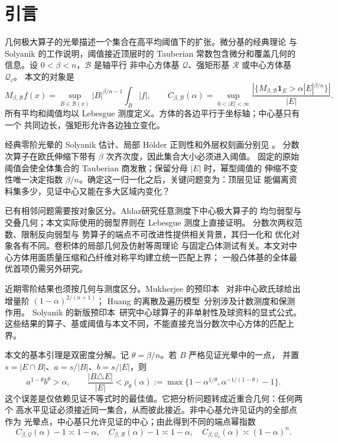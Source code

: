 \section{引言}\label{sec:introduction}

几何极大算子的光晕描述一个集合在高平均阈值下的扩张。微分基的经典理论
\cite{deGuzman1975}与 Solyanik 的工作\cite{Solyanik1993}说明，阈值接近顶层时的
Tauberian 常数包含微分和覆盖几何的信息。设 $0<\beta<n$，$\mathcal B$ 是轴平行
非中心方体基 $\mathcal Q$、强矩形基 $\mathcal R$ 或中心方体基 $\mathcal Q_c$。
本文的对象是
\[
 M_{\beta,\mathcal B}f(x)=\sup_{B\in\mathcal B(x)}
 |B|^{\beta/n-1}\int_B|f|,
 \qquad
 C_{\beta,\mathcal B}(\alpha)=\sup_{0<|E|<\infty}
 \frac{|\{M_{\beta,\mathcal B}\mathbf1_E>\alpha|E|^{\beta/n}\}|}{|E|}.
\]
所有平均和阈值均以 Lebesgue 测度定义。方体的各边平行于坐标轴；中心基只有一个
共同边长，强矩形允许各边独立变化。

经典零阶光晕的 Solyanik 估计、局部 H\"older 正则性和外层权刻画分别见
\cite{HagelsteinParissis2014,HagelsteinParissis2015,HagelsteinParissis2016,HagelsteinParissis2018}。
分数次算子在欧氏伸缩下带有 $\beta$ 次齐次度，因此集合大小必须进入阈值。
固定的原始阈值会使全体集合的 Tauberian 商发散；保留分母 $|E|$ 时，幂型阈值的
伸缩不变性唯一决定指数 $\beta/n$。确定这一归一化之后，关键问题变为：顶层见证
能偏离资料集多少，见证中心又能在多大区域内变化？

已有相邻问题需要按对象区分。Aldaz\cite{Aldaz2021}研究任意测度下中心极大算子的
均匀弱型与交叠几何；本文实际使用的弱型界则在 Lebesgue 测度上直接证明。
分数次两权范数\cite{BanuelosOsekowski2025}、限制反向弱型\cite{Lerner2026}与
势算子的端点不可改进性\cite{MihulaPickSchikorra2026}提供相关背景，其归一化和
优化对象各有不同。卷积体的局部几何\cite{Haddad2025}及仿射等周理论
\cite{LutwakYangZhang2000}与固定凸体测试有关。本文对中心方体用面质量压缩和凸纤维对称平均建立统一匹配上界；
一般凸体基的全体最优首项仍需另外研究。

近期零阶结果也须按几何与测度区分。Mukherjee 的预印本~\cite{Mukherjee2026}
对非中心欧氏球给出增量阶 $(1-\alpha)^{2/(n+1)}$；
Huang 的离散及遍历模型~\cite{HuangDiscrete2026,HuangFlows2026}分别涉及计数测度和保测作用。
Solyanik 的新版预印本~\cite{Solyanik2026}研究中心球算子的非单射性及球资料的显式公式。
这些结果的算子、基或阈值与本文不同，不能直接充当分数次中心方体的匹配上界。

本文的基本引理是双密度分解。记 $\theta=\beta/n$。若 $B$ 严格见证光晕中的一点，
并置 $s=|E\cap B|$、$a=s/|B|$、$b=s/|E|$，则
\[
 a^{1-\theta}b^\theta>\alpha,
 \qquad
 \frac{|B\triangle E|}{|E|}
 <\rho_\theta(\alpha):=
 \max\{1-\alpha^{1/\theta},\alpha^{-1/(1-\theta)}-1\}.
\]
这个误差是仅依赖见证不等式时的最佳值。它把分析问题转成近重合几何：任何两个
高水平见证必须接近同一集合，从而彼此接近。非中心基允许见证内的全部点作为
光晕点，中心基只允许见证的中心；由此得到不同的端点幂指数
\[
 C_{\beta,\mathcal Q}(\alpha)-1\asymp1-\alpha,
 \quad C_{\beta,\mathcal R}(\alpha)-1\asymp1-\alpha,
 \quad C_{\beta,\mathcal Q_c}(\alpha)\asymp(1-\alpha)^n.
\]

